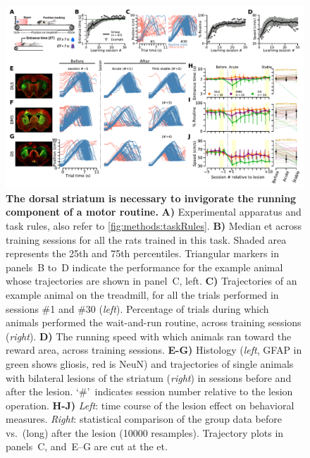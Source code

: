 \begin{figure}[bt!]
	\begin{center}
		\includegraphics[width=\textwidth]{ch-lesion/figures/Task_Example_Group.pdf}
		\caption[The Striatum Energizes Motor Routines]
		{\textbf{The dorsal striatum is necessary to invigorate the running component of a motor routine.}
		\textbf{A)}
		Experimental apparatus and task rules, also refer to \autoref{fig:methods:taskRules}.
		\textbf{B)}
		Median \gls{et} across training sessions for all the rats trained in this task.
		Shaded area represents the 25th and 75th percentiles.
		Triangular markers in panels~B to~D indicate the performance for the example animal whose trajectories are shown in panel~C, left.
		\textbf{C)}
		Trajectories of an example animal on the treadmill, for all the trials performed in sessions \#1 and \#30 (\textit{left}).
		Percentage of trials during which animals performed the wait-and-run routine, across training sessions (\textit{right}).
		\textbf{D)}
		The running speed with which animals ran toward the reward area, across training sessions.
		\textbf{E-G)}
		Histology (\textit{left}, GFAP in green shows gliosis, red is NeuN) and trajectories of single animals with bilateral lesions of the striatum (\textit{right}) in sessions before and after the lesion.
		`\#'~indicates session number relative to the lesion operation.
		\textbf{H-J)}
		\textit{Left}: time course of the lesion effect on behavioral measures.
		\textit{Right}: statistical comparison of the group data before vs.\ (long) after the lesion (10000 resamples).
		Trajectory plots in panels~C, and~E--G are cut at the \gls{et}.
		}
		\label{fig:lesion:task}
	\end{center}
\end{figure}